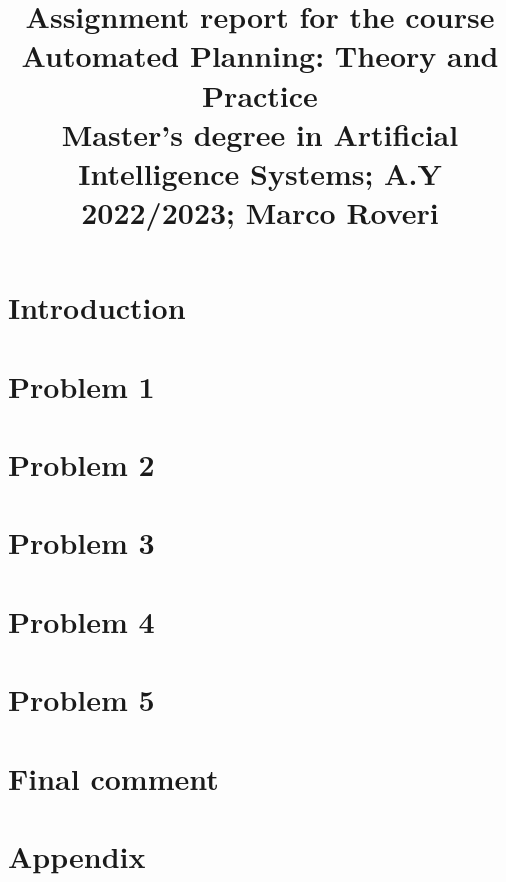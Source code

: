 \documentclass[conference]{IEEEtran}
\begin{document}
\title{Assignment report for the course\\ Automated Planning: Theory and Practice\\
{\footnotesize Master's degree in Artificial Intelligence Systems;
A.Y 2022/2023;
Marco Roveri}
}

\author{

\and
{}

}

\maketitle

\section{Introduction}

\section{Problem 1}

\section{Problem 2}

\section{Problem 3}

\section{Problem 4}

\section{Problem 5}

\section{Final comment}



\pagebreak
\onecolumn

\section{Appendix}

\end{document}
